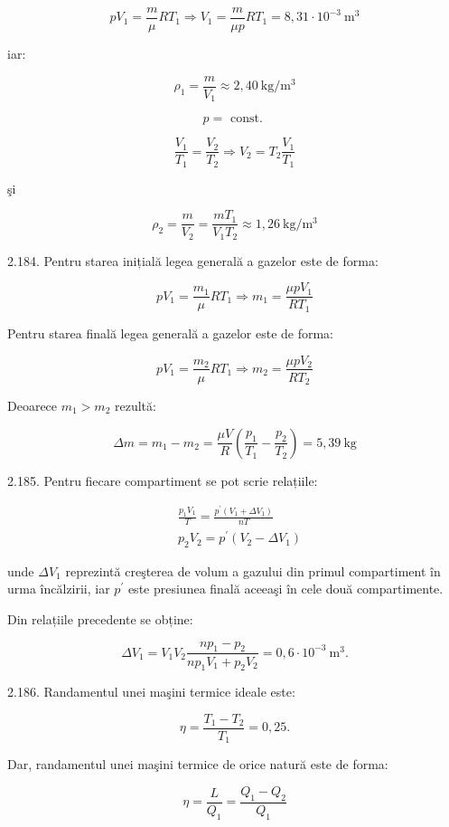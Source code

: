 $$
p V_{1}=\frac{m}{\mu} R T_{1} \Rightarrow V_{1}=\frac{m}{\mu p} R T_{1}=8,31 \cdot 10^{-3} \mathrm{~m}^{3}
$$

iar:

$$
\rho_{1}=\frac{m}{V_{1}} \approx 2,40 \mathrm{~kg} / \mathrm{m}^{3}
$$

$$
p=\text { const. }
$$

$$
\frac{V_{1}}{T_{1}}=\frac{V_{2}}{T_{2}} \Rightarrow V_{2}=T_{2} \frac{V_{1}}{T_{1}}
$$

şi

$$
\rho_{2}=\frac{m}{V_{2}}=\frac{m T_{1}}{V_{1} T_{2}} \approx 1,26 \mathrm{~kg} / \mathrm{m}^{3}
$$

2.184. Pentru starea inițială legea generală a gazelor este de forma:

$$
p V_{1}=\frac{m_{1}}{\mu} R T_{1} \Rightarrow m_{1}=\frac{\mu p V_{1}}{R T_{1}}
$$

Pentru starea finală legea generală a gazelor este de forma:

$$
p V_{1}=\frac{m_{2}}{\mu} R T_{1} \Rightarrow m_{2}=\frac{\mu p V_{2}}{R T_{2}}
$$

Deoarece $m_{1}>m_{2}$ rezultă:

$$
\Delta m=m_{1}-m_{2}=\frac{\mu V}{R}\left(\frac{p_{1}}{T_{1}}-\frac{p_{2}}{T_{2}}\right)=5,39 \mathrm{~kg}
$$

2.185. Pentru fiecare compartiment se pot scrie relațiile:

$$
\begin{aligned}
& \frac{p_{1} V_{1}}{T}=\frac{p^{\prime}\left(V_{1}+\Delta V_{1}\right)}{n T} \\
& p_{2} V_{2}=p^{\prime}\left(V_{2}-\Delta V_{1}\right)
\end{aligned}
$$

unde $\Delta V_{1}$ reprezintă creşterea de volum a gazului din primul compartiment în urma încălzirii, iar $p^{\prime}$ este presiunea finală aceeaşi în cele două compartimente.

Din relațiile precedente se obține:

$$
\Delta V_{1}=V_{1} V_{2} \frac{n p_{1}-p_{2}}{n p_{1} V_{1}+p_{2} V_{2}}=0,6 \cdot 10^{-3} \mathrm{~m}^{3} .
$$

2.186. Randamentul unei maşini termice ideale este:

$$
\eta=\frac{T_{1}-T_{2}}{T_{1}}=0,25 .
$$

Dar, randamentul unei maşini termice de orice natură este de forma:

$$
\eta=\frac{L}{Q_{1}}=\frac{Q_{1}-Q_{2}}{Q_{1}}
$$

